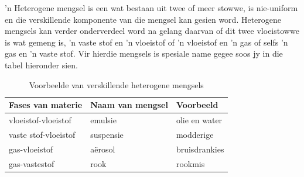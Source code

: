 \label{m38708*fhsst!!!underscore!!!id89}\Definition{\label{id2405839} { Heterogene mengsel }} 
{ \label{m38708*meaningfhsst!!!underscore!!!id89}
        'n Heterogene mengsel is een wat bestaan uit twee of meer stowwe, is nie-uniform en die verskillende komponente van die mengsel kan gesien word.
         } 
Heterogene mengsels kan verder onderverdeel word na gelang daarvan of dit twee vloeistowwe is wat gemeng is, 'n vaste stof en 'n vloeistof of 'n vloeistof en 'n gas of selfs 'n gas en 'n vaste stof. Vir hierdie mengsels is spesiale name gegee soos jy in die tabel hieronder sien.   \par
\begin{table}[h!]
 \begin{center}
  \begin{tabular}{|l|l|l|}\hline
   \textbf{Fases van materie} & \textbf{Naam van mengsel} & \textbf{Voorbeeld} \\ \hline
   vloeistof-vloeistof & emulsie & olie en water \\ \hline
   vaste stof-vloeistof & suspensie & modderige \\ \hline
   gas-vloeistof & a\"erosol & bruisdrankies \\ \hline
   gas-vastestof & rook & rookmis \\ \hline
  \end{tabular}

 \end{center}
\caption{Voorbeelde van verskillende heterogene mengsels}
\label{tab:mixtures}
\end{table}

      \label{m38708*uid6}
